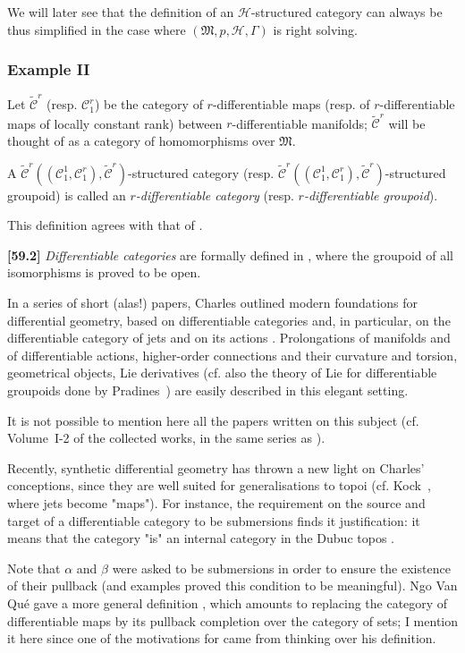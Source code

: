 \documentclass[a4paper,fleqn]{article}
\theoremstyle{plain}
\theoremstyle{definition}
\newenvironment{definition}[1]
  {\renewcommand\theinnerdefinition{#1}\innerdefinition}
  {\endinnerdefinition}
\newenvironment{longcomm}[1]
  {\noindent\textbf{[#1]}\rmfamily}
  {}
\newcommand{\oldpage}[1]{{\marginpar{\footnotesize$\bigg\vert$\,\,\,\,\textit{p.~#1}}}}
\newcommand{\CC}{\mathcal{C}}
\newcommand{\tCC}{\widetilde{\CC}}
\newcommand{\HH}{\mathcal{H}}
\newcommand{\MM}{\mathfrak{M}}
\begin{document}
We will later see that the definition of an $\HH$-structured category can always be thus simplified in the case where $(\MM,p,\HH,\Gamma)$ is right solving.


\subsubsection*{Example II}
\label{section:ii.3.ii}

Let $\tCC^r$ (resp. $\CC_1^r$) be the category of $r$-differentiable maps (resp. of $r$-differentiable maps of locally constant rank) between $r$-differentiable manifolds;
$\tCC^r$ will be thought of as a category of homomorphisms over $\MM$.

\oldpage{387}

\begin{definition}{8}
\label{definition:ii-8}
  A $\tCC^r((\CC_1^1,\CC_1^r),\tCC^r)$-structured category (resp. $\tCC^r((\CC_1^1,\CC_1^r),\tCC^r)$-structured groupoid) is called an \emph{$r$-differentiable category} (resp. \emph{$r$-differentiable groupoid}).
\end{definition}

This definition agrees with that of \cite{3b}.

\begin{longcomm}{59.2}
  \emph{Differentiable categories} are formally defined in \cite{coll50}, where the groupoid of all isomorphisms is proved to be open.

  In a series of short (alas!) papers, Charles outlined modern foundations for differential geometry, based on differentiable categories and, in particular, on the differentiable category of jets and on its actions \cite{coll46,coll78,coll101,coll103,coll105,coll116}.
  Prolongations of manifolds and of differentiable actions, higher-order connections and their curvature and torsion, geometrical objects, Lie derivatives (cf. also the theory of Lie for differentiable groupoids done by Pradines~\cite{comm85}) are easily described in this elegant setting.

  It is not possible to mention here all the papers written on this subject (cf. Volume~I-2 of the collected works, in the same series as \cite{coll}).

  Recently, synthetic differential geometry has thrown a new light on Charles' conceptions, since they are well suited for generalisations to topoi (cf. Kock~\cite{comm61}, where jets become "maps").
  For instance, the requirement on the source and target of a differentiable category to be submersions finds it justification: it means that the category "is" an internal category in the Dubuc topos \cite{comm27}.

  Note that $\alpha$ and $\beta$ were asked to be submersions in order to ensure the existence of their pullback (and examples proved this condition to be meaningful).
  Ngo Van Qué gave a more general definition \cite{comm80}, which amounts to replacing the category of differentiable maps by its pullback completion over the category of sets;
  I mention it here since one of the motivations for \cite{coll107} came from thinking over his definition.
\end{longcomm}
\end{document}
